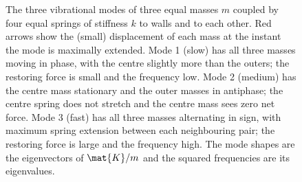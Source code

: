 \begin{figure}[htbp]
\caption[Three mode shapes of a three-mass linear spring chain]{The
three vibrational modes of three equal masses $m$ coupled by four
equal springs of stiffness $k$ to walls and to each other. Red arrows
show the (small) displacement of each mass at the instant the mode is
maximally extended. Mode 1 (slow) has all three masses moving in
phase, with the centre slightly more than the outers; the restoring
force is small and the frequency low. Mode 2 (medium) has the centre
mass stationary and the outer masses in antiphase; the centre spring
does not stretch and the centre mass sees zero net force. Mode 3
(fast) has all three masses alternating in sign, with maximum spring
extension between each neighbouring pair; the restoring force is
large and the frequency high. The mode shapes are the eigenvectors of
$\mat{K}/m$ and the squared frequencies are its eigenvalues.}
\label{fig:vol02:ch10:vibration-modes}
\end{figure}
